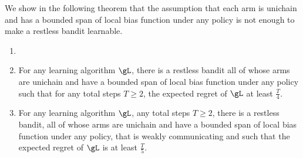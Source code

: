 We show in the following theorem that the assumption that each arm is unichain and has a bounded span of local bias function under any policy is not enough to make a restless bandit learnable.

\begin{thm}
    \label{thm:non_learnable}
    \begin{enumerate}[label=(\roman*)]
        \item[]
        \item \label{it:non_learnable1} For any learning algorithm $\gL$, there is a restless bandit all of whose arms are unichain and have a bounded span of local bias function under any policy such that for any total steps $T\ge2$, the expected regret of $\gL$ at least $\frac{T}4$.
        \item \label{it:non_learnable2} For any learning algorithm $\gL$, any total steps $T\ge2$, there is a restless bandit, all of whose arms are unichain and have a bounded span of local bias function under any policy, that is weakly communicating and such that the expected regret of $\gL$ is at least $\frac{T}5$.
    \end{enumerate}
\end{thm}
